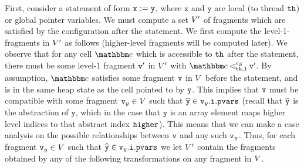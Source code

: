 First, consider a statement of form
${\tt x := y}$, where $\mathtt{x}$ and $\mathtt{y}$ are local
(to thread ${\tt th}$) or global pointer variables.
We must compute a set $V'$ of
fragments which are satisfied by the configuration after the statement.
We first compute the level-1-fragments in $V'$ as follows
(higher-level fragments will be computed later).
We observe that for any cell $\cell$ which is accessible to ${\tt th}$ after
the statement, there must be some level-1 fragment $\mathtt{v}'$ in $V'$
with $\cell \lsatfrag{1}{\thread}{\sconf} \frag'$.
By assumption, $\cell$ satisfies some fragment $\mathtt{v}$ in $V$
before the statement, and is in the same heap state as the cell pointed to by
$\mathtt{y}$.
This implies that $\mathtt{v}$ must be compatible with some
fragment $\mathtt{v}_y\in V$ such that $\widehat{\mathtt{y}} \in \mathtt{v}_y.\mathtt{i}.\mathtt{pvars}$
  (recall that $\widehat{\mathtt{y}}$ is the abstraction of $\mathtt{y}$, which
  in the case that $\mathtt{y}$ is an array element
  maps higher level indices to that abstract index $\tt higher$).
This means that we can make a case analysis on the possible relationships
between $\mathtt{v}$ and any such $\mathtt{v}_y$.
Thus, for each fragment $\mathtt{v}_y\in V$ such that
$\widehat{\mathtt{y}} \in \mathtt{v}_y.\mathtt{i}.\mathtt{pvars}$ we let $V'$ contain
the fragments obtained by any of the following transformations on any fragment in
$V$.

